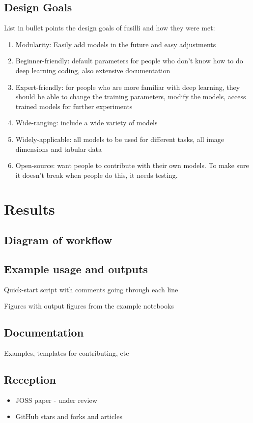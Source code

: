 \subsection{Design Goals}
List in bullet points the design goals of fusilli and how they were met: 
\begin{enumerate}
    \item Modularity: Easily add models in the future and easy adjustments
    \item Beginner-friendly: default parameters for people who don't know how to do deep learning coding, also extensive documentation
    \item Expert-friendly: for people who are more familiar with deep learning, they should be able to change the training parameters, modify the models, access trained models for further experiments
    \item Wide-ranging: include a wide variety of models
    \item Widely-applicable: all models to be used for different tasks, all image dimensions and tabular data
    \item Open-source: want people to contribute with their own models. To make sure it doesn't break when people do this, it needs testing. 
\end{enumerate}


\section{Results}

\subsection{Diagram of workflow}

\subsection{Example usage and outputs}
Quick-start script with comments going through each line

Figures with output figures from the example notebooks

\subsection{Documentation}
Examples, templates for contributing, etc


\subsection{Reception}
\begin{itemize}
    \item JOSS paper - under review 
    \item GitHub stars and forks and articles
\end{itemize}

